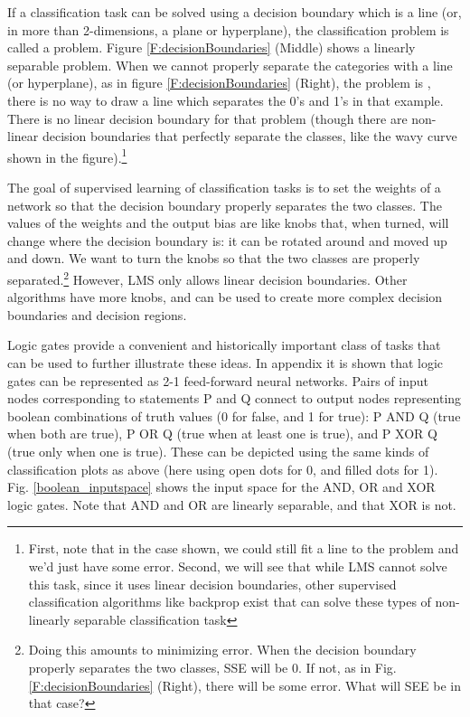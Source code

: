If a classification task can be solved using a decision boundary which is a line (or, in more than 2-dimensions, a plane or hyperplane), the classification problem is called a  problem. Figure \ref{F:decisionBoundaries} (Middle) shows a linearly separable problem. When we cannot properly separate the categories with a line (or hyperplane), as in figure \ref{F:decisionBoundaries} (Right), the problem is , there is no way to draw a line which separates the 0's and 1's in that example. There is no linear decision boundary for that problem (though there are non-linear decision boundaries that perfectly separate the classes, like the wavy curve shown in the figure).\footnote{First, note that in the case shown, we could still fit a line to the problem and we'd just have some error. Second, we will see that while LMS cannot solve this task, since it uses linear decision boundaries, other supervised classification algorithms like backprop exist that can solve these types of non-linearly separable classification task}

The goal of supervised learning of classification tasks is to set the weights of a network so that the decision boundary properly separates the two classes. The values of the weights and the output bias are like knobs that, when turned, will change where the decision boundary is: it can be rotated around and moved up and down. We want to turn the knobs so that the two classes are properly separated.\footnote{Doing this amounts to minimizing error. When the decision boundary properly separates the two classes, SSE will be 0. If not, as in Fig. \ref{F:decisionBoundaries} (Right), there will be some error. What will SEE be in that case?}  However, LMS only allows linear decision boundaries. Other algorithms have more knobs, and can be used to create more complex decision boundaries and decision regions.
  
Logic gates provide a convenient and historically important class of tasks that can be used to further illustrate these ideas. In appendix  it is shown that logic gates can be represented as 2-1 feed-forward neural networks. Pairs of input nodes corresponding to statements P and Q connect to output nodes representing boolean combinations of truth values (0 for false, and 1 for true): P AND Q (true when both are true), P OR Q (true when at least one is true), and P XOR Q (true only when one is true). These can be depicted using the same kinds of classification plots as above (here using open dots for 0, and filled dots for 1). Fig. \ref{boolean_inputspace} shows the input space for the AND, OR and XOR logic gates. Note that AND and OR are linearly separable, and that XOR is not.

